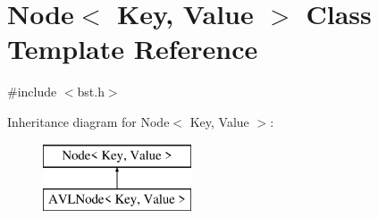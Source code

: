 \hypertarget{classNode}{\section{Node$<$ Key, Value $>$ Class Template Reference}
\label{classNode}
}


{\ttfamily \#include $<$bst.\-h$>$}

Inheritance diagram for Node$<$ Key, Value $>$\-:\begin{figure}[H]
\begin{center}
\leavevmode
\includegraphics[height=2.000000cm]{classNode}
\end{center}
\end{figure}
